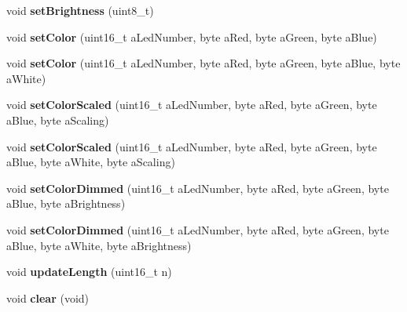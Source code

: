 \begin{DoxyCompactItemize}
void {\bfseries set\+Brightness} (uint8\+\_\+t)
\item 
\mbox{\label{classAdafruit__NeoPixel_a15e4c6e71f70582517d841e1b060c21f}} 
void {\bfseries set\+Color} (uint16\+\_\+t a\+Led\+Number, byte a\+Red, byte a\+Green, byte a\+Blue)
\item 
\mbox{\label{classAdafruit__NeoPixel_af09c7970ce6978ba468beda8464c6a83}} 
void {\bfseries set\+Color} (uint16\+\_\+t a\+Led\+Number, byte a\+Red, byte a\+Green, byte a\+Blue, byte a\+White)
\item 
\mbox{\label{classAdafruit__NeoPixel_a2b0618ef7de89190294b2b5bc3af1636}} 
void {\bfseries set\+Color\+Scaled} (uint16\+\_\+t a\+Led\+Number, byte a\+Red, byte a\+Green, byte a\+Blue, byte a\+Scaling)
\item 
\mbox{\label{classAdafruit__NeoPixel_a9fb9d6f7f56891cf008076b4b149e972}} 
void {\bfseries set\+Color\+Scaled} (uint16\+\_\+t a\+Led\+Number, byte a\+Red, byte a\+Green, byte a\+Blue, byte a\+White, byte a\+Scaling)
\item 
\mbox{\label{classAdafruit__NeoPixel_af8c39f85dfd10ba9d87ed179ab6051a7}} 
void {\bfseries set\+Color\+Dimmed} (uint16\+\_\+t a\+Led\+Number, byte a\+Red, byte a\+Green, byte a\+Blue, byte a\+Brightness)
\item 
\mbox{\label{classAdafruit__NeoPixel_ab79f6348721a4280422a88fd51e4264d}} 
void {\bfseries set\+Color\+Dimmed} (uint16\+\_\+t a\+Led\+Number, byte a\+Red, byte a\+Green, byte a\+Blue, byte a\+White, byte a\+Brightness)
\item 
\mbox{\label{classAdafruit__NeoPixel_a74e917093c2eb16848c4a09427680f79}} 
void {\bfseries update\+Length} (uint16\+\_\+t n)
\item 
\mbox{\label{classAdafruit__NeoPixel_ae259682b202be0acd258d6879f4c7121}} 
void {\bfseries clear} (void)
\item 
\mbox{\label{classAdafruit__NeoPixel_a9141513e6c0d982d79f8bda2924f9b94}} 

\end{DoxyCompactItemize}
